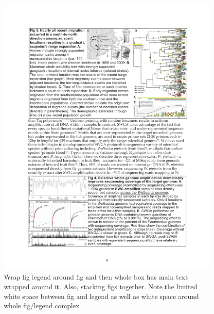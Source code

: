 \documentclass[letterpaper,12pt]{article}%
\begin{document}
\begin{figure}[h!]
\centering
\includegraphics[scale=0.7]{FancyFigLegend.pdf}
\caption{Wrap fig legend around fig and then whole box has main text wrapped around it. Also, stacking figs together. Note the limited white space between fig and legend as well as white space around whole fig/legend complex}
\label{fig:FancefigLegend}
\end{figure}
\end{document}
